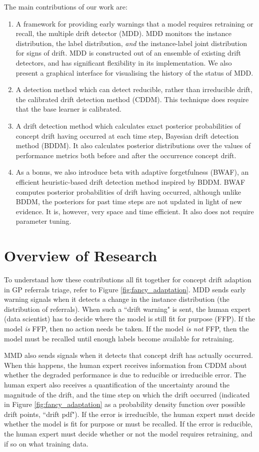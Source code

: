 The main contributions of our work are:
\begin{enumerate}
  \item A framework for providing early warnings that a model requires retraining or recall, the multiple drift detector (MDD). MDD monitors the instance distribution, the label distribution, {\it and} the instance-label joint distribution for signs of drift. MDD is constructed out of an ensemble of existing drift detectors, and has significant flexibility in its implementation. We also present a graphical interface for visualising the history of the status of MDD.
  \item A detection method which can detect reducible, rather than irreducible drift, the calibrated drift detection method (CDDM). This technique does require that the base learner is calibrated.
  \item A drift detection method which calculates exact posterior probabilities of concept drift having occurred at each time step, Bayesian drift detection method (BDDM). It also calculates posterior distributions over the values of performance metrics both before and after the occurrence concept drift.
  \item As a bonus, we also introduce beta with adaptive forgetfulness (BWAF), an efficient heuristic-based drift detection method inspired by BDDM. BWAF computes posterior probabilities of drift having occurred, although unlike BDDM, the posteriors for past time steps are not updated in light of new evidence. It is, however, very space and time efficient. It also does not require parameter tuning.
\end{enumerate}

\section{Overview of Research}

To understand how these contributions all fit together for concept drift adaption in GP referrals triage, refer to Figure \ref{fig:fancy_adaptation}. MDD sends early warning signals when it detects a change in the instance distribution (the distribution of referrals). When such a ``drift warning" is sent, the human expert (data scientist) has to decide where the model is still fit for purpose (FFP). If the model {\it is} FFP, then no action needs be taken. If the model {\it is not} FFP, then the model must be recalled until enough labels become available for retraining.

MMD also sends signals when it detects that concept drift has actually occurred. When this happens, the human expert receives information from CDDM about whether the degraded performance is due to reducible or irreducible error. The human expert also receives a quantification of the uncertainty around the magnitude of the drift, and the time step on which the drift occurred (indicated in Figure \ref{fig:fancy_adaptation} as a probability density function over possible drift points, ``drift pdf"). If the error is irreducible, the human expert must decide whether the model is fit for purpose or must be recalled. If the error is reducible, the human expert must decide whether or not the model requires retraining, and if so on what training data.

